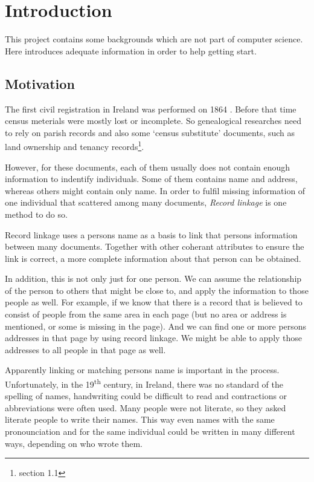 \chapter{Introduction}
\label{ch:introduction}

This project contains some backgrounds which are not part of computer science.
Here introduces adequate information in order to help getting start.

\section{Motivation}

The first civil registration in Ireland was performed on 1864 \cite[]{irishregistration}.
Before that time census meterials were mostly lost or incomplete. So genealogical researches
need to rely on parish records and also some `census substitute' documents,
such as land ownership and tenancy records\footnote{\cite[]{adamw} section 1.1}.

However, for these documents, each of them usually does not contain enough
information to indentify individuals. Some of them contains name and address,
whereas others might contain only name. In order to fulfil missing information
of one individual that scattered among many documents, \emph{Record linkage}
is one method to do so.


Record linkage uses a person\textquotesingle s name as a basis to link that
person\textquotesingle s information between many documents.
Together with other coherant attributes to ensure the link is correct, a
more complete information about that person can be obtained.

In addition, this is not only just for one person. We can assume the relationship
of the person to others that might be close to, and apply the information
to those people as well. For example, if we know that there is a record
that is believed to consist of people from the same area in each page \cite[]{morpeth}
(but no area or address is mentioned, or some is missing in the page). And we can find
one or more person\textquotesingle s addresses in that page by using record linkage.
We might be able to apply those addresses to all people in that page as well.

Apparently linking or matching person\textquotesingle s name is important in the process.
Unfortunately, in the 19\textsuperscript{th} century, in Ireland, there was no standard
of the spelling of names, handwriting could be difficult to read
and contractions or abbreviations were often used. Many people were not literate,
so they asked literate people to write their names.
This way even names with the same pronounciation and for the same individual
could be written in many different ways, depending on who wrote them.

